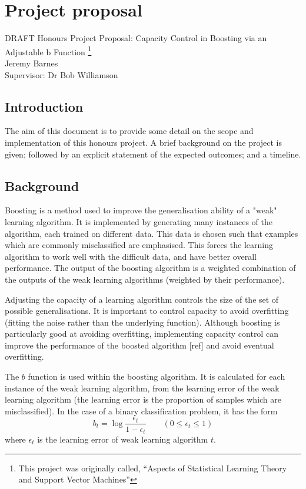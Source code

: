 \chapter{Project proposal}

\begin{center}
{\Large DRAFT Honours Project Proposal:
Capacity Control in Boosting via an Adjustable  b Function
\footnote{This project was originally called, ``Aspects
of Statistical Learning Theory and Support Vector Machines''} \\
Jeremy Barnes \\
Supervisor: Dr Bob Williamson}
\end{center}

\section{Introduction}
The aim of this document is to provide some detail on the scope and
implementation of this honours project.  A brief background on the
project is given; followed by an explicit statement of the expected
outcomes; and a timeline.

\section{Background}
Boosting is a method used to improve the generalisation ability of a
"weak" learning algorithm.  It is implemented by generating many
instances of the algorithm, each trained on different data.  This data
is chosen such that examples which are commonly misclassified are
emphasised.  This forces the learning algorithm to work well with the
difficult data, and have better overall performance.  The output of
the boosting algorithm is a weighted combination of the outputs of the
weak learning algorithms (weighted by their performance).

Adjusting the capacity of a learning algorithm controls the size of
the set of possible generalisations.  It is important to control
capacity to avoid overfitting (fitting the noise rather than the
underlying function).  Although boosting is particularly good at
avoiding overfitting, implementing capacity control can improve the
performance of the boosted algorithm [ref] and avoid eventual
overfitting.

The $b$ function is used within the boosting algorithm.  It is
calculated for each instance of the weak learning algorithm, from the
learning error of the weak learning algorithm (the learning error is
the proportion of samples which are misclassified).  In the case of a
binary classification problem, it has the form
%
\begin{equation}
b_t = \log \frac{\epsilon_t}{1-\epsilon_t} \qquad (0 \leq \epsilon_t
\leq 1)
\end{equation}
%	
where $\epsilon_t$ is the learning error of weak learning algorithm  $t$.

